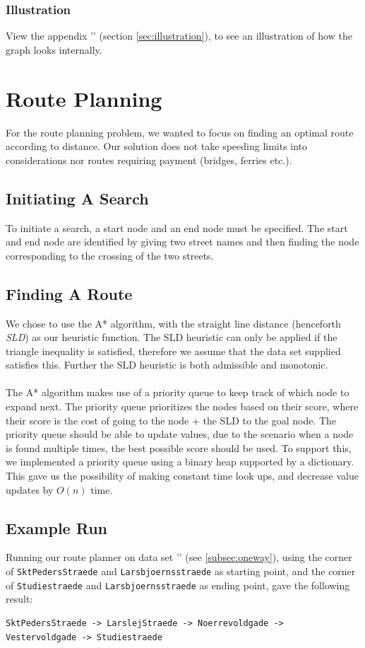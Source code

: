 \documentclass[11pt]{article}
\begin{document}
\subsubsection{Illustration}
View the appendix '' (section \autoref{sec:illustration}), to see an illustration of how the graph looks internally.

\section{Route Planning}
For the route planning problem, we wanted to focus on finding an optimal route according to distance. Our solution does not take speeding limits into considerations nor routes requiring payment (bridges, ferries etc.).

\subsection{Initiating A Search}
To initiate a search, a start node and an end node must be specified. The start and end node are identified by giving two street names and then finding the node corresponding to the crossing of the two streets.

\subsection{Finding A Route}
We chose to use the A* algorithm, with the straight line distance (henceforth \emph{SLD}) as our heuristic function. The SLD heuristic can only be applied if the triangle inequality is satisfied, therefore we assume that the data set supplied satisfies this. Further the SLD heuristic is both admissible and monotonic.\\
\\
The A* algorithm makes use of a priority queue to keep track of which node to expand next. The priority queue prioritizes the nodes based on their score, where their score is the cost of going to the node + the SLD to the goal node. The priority queue should be able to update values, due to the scenario when a node is found multiple times, the best possible score should be used. To support this, we implemented a priority queue using a binary heap supported by a dictionary. This gave us the possibility of making constant time look ups, and decrease value updates by $O(n)$ time.

\subsection{Example Run}
Running our route planner on data set '' (see \ref{subsec:oneway}), using the corner of {\tt SktPedersStraede} and {\tt Larsbjoernsstraede} as starting point, and the corner of {\tt Studiestraede} and {\tt Larsbjoernsstraede} as ending point, gave the following result:
\begin{lstlisting}[style=logoutput]
SktPedersStraede -> LarslejStraede -> Noerrevoldgade ->
Vestervoldgade -> Studiestraede
\end{lstlisting}
\end{document}
